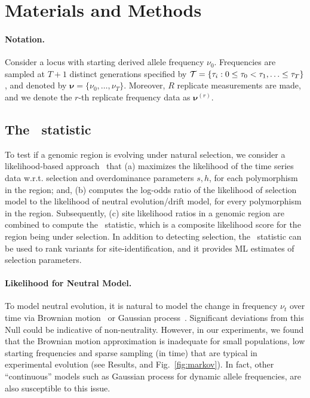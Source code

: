 \section{Materials and Methods}
\label{sec:method}
\paragraph{Notation.} 
Consider a locus with starting derived allele frequency
$\nu_0$. Frequencies are sampled at $T+1$ distinct generations specified
by ${\cal T}= \{\tau_i: 0\le \tau_0<\tau_1,\ldots\le \tau_T\}$, and
denoted by $\bm{\nu}=\{\nu_0,\ldots,\nu_T\}$. Moreover, $R$ replicate
measurements are made, and we denote the $r$-th replicate frequency
data as $\bm{\nu}^{(r)}$.

\subsection{The \comale\  statistic}
To test if a genomic region is evolving under natural selection, we
consider a likelihood-based
approach~\cite{vitti2013detecting,nielsen2005genomic,Terhorst2015Multi}
that (a) maximizes the likelihood of the time series data
w.r.t. selection and overdominance parameters $s,h$, for each
polymorphism in the region; and, (b) computes the log-odds ratio of
the likelihood of selection model to the likelihood of neutral
evolution/drift model, for every polymorphism in the
region. Subsequently, (c) site likelihood ratios in a genomic region
are combined to compute the \comale\ statistic, which is a composite
likelihood score for the region being under selection. In addition to
detecting selection, the \comale\ statistic can be used to rank
variants for site-identification, and it provides ML estimates of
selection parameters.

\paragraph{Likelihood for Neutral Model.}
To model neutral evolution, it is natural to model the change in
frequency $\nu_t$ over time via Brownian
motion~\cite{feder2014Identifying} or Gaussian
process~\cite{Terhorst2015Multi}. Significant deviations from this
Null could be indicative of non-neutrality. However, in our
experiments, we found that the Brownian motion approximation is
inadequate for small populations, low starting frequencies and sparse
sampling (in time) that are typical in experimental evolution (see
Results, and Fig.~\ref{fig:markov}). In fact, other ``continuous''
models such as Gaussian process for dynamic allele frequencies, are
also susceptible to this issue.

